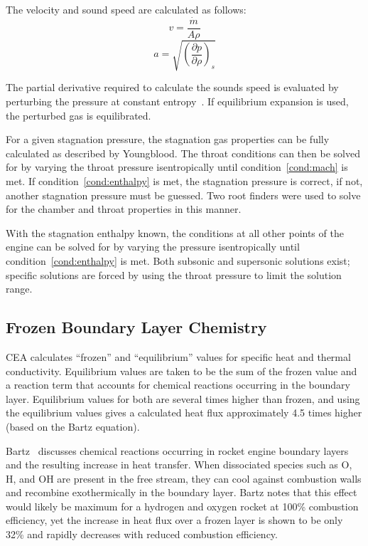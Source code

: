 \documentclass[11pt]{article}
\begin{document}
The velocity and sound speed are calculated as follows:
\begin{equation}
  v = \frac{\dot{m}}{A \rho}
\end{equation}%
\begin{equation}
  a = \sqrt{\left(\frac{\partial p}{\partial \rho}\right)_s}
\end{equation}

The partial derivative required to calculate the sounds speed is evaluated by perturbing the pressure at constant entropy~\cite{_cantera_????}. If equilibrium expansion is used, the perturbed gas is equilibrated.

For a given stagnation pressure, the stagnation gas properties can be fully calculated as described by Youngblood. The throat conditions can then be solved for by varying the throat pressure isentropically until condition~\ref{cond:mach} is met. If condition~\ref{cond:enthalpy} is met, the stagnation pressure is correct, if not, another stagnation pressure must be guessed. Two root finders were used to solve for the chamber and throat properties in this manner.

With the stagnation enthalpy known, the conditions at all other points of the engine can be solved for by varying the pressure isentropically until condition~\ref{cond:enthalpy} is met. Both subsonic and supersonic solutions exist; specific solutions are forced by using the throat pressure to limit the solution range.


\subsection{Frozen Boundary Layer Chemistry}

CEA calculates ``frozen'' and ``equilibrium'' values for specific heat and thermal conductivity. Equilibrium values are taken to be the sum of the frozen value and a reaction term that accounts for chemical reactions occurring in the boundary layer. Equilibrium values for both are several times higher than frozen, and using the equilibrium values gives a calculated heat flux approximately 4.5 times higher (based on the Bartz equation).

Bartz~\cite[Page 46]{bartz_turbulent_1965} discusses chemical reactions occurring in rocket engine boundary layers and the resulting increase in heat transfer. When dissociated species such as O, H, and OH are present in the free stream, they can cool against combustion walls and recombine exothermically in the boundary layer. Bartz notes that this effect would likely be maximum for a hydrogen and oxygen rocket at 100\% combustion efficiency, yet the increase in heat flux over a frozen layer is shown to be only 32\% and rapidly decreases with reduced combustion efficiency.
\end{document}
